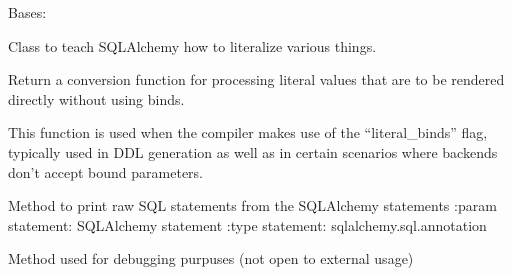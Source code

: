 
\begin{fulllineitems}
\label{\detokenize{eboa.engine:eboa.engine.printing.StringLiteral}}
Bases: 

Class to teach SQLAlchemy how to literalize various things.

\begin{fulllineitems}
\label{\detokenize{eboa.engine:eboa.engine.printing.StringLiteral.literal_processor}}
Return a conversion function for processing literal values that are
to be rendered directly without using binds.

This function is used when the compiler makes use of the
“literal\_binds” flag, typically used in DDL generation as well
as in certain scenarios where backends don’t accept bound parameters.


\end{fulllineitems}


\end{fulllineitems}


\begin{fulllineitems}
\label{\detokenize{eboa.engine:eboa.engine.printing.literal_query}}
Method to print raw SQL statements from the SQLAlchemy statements
:param statement: SQLAlchemy statement
:type statement: sqlalchemy.sql.annotation

Method used for debugging purpuses (not open to external usage)

\end{fulllineitems}



